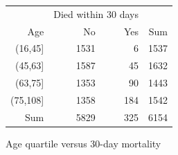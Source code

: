 \begin{figure}[ht]
\centering
\begin{tabular}{rrrr}
  \hline
    & \multicolumn{2}{c}{Died within 30 days} & \\
Age & No & Yes & Sum \\
  \hline
(16,45] & 1531 & 6 & 1537 \\
  (45,63] & 1587 & 45 & 1632 \\
  (63,75] & 1353 & 90 & 1443 \\
  (75,108] & 1358 & 184 & 1542 \\
  Sum & 5829 & 325 & 6154 \\
   \hline
\end{tabular}
\caption{Age quartile versus 30-day mortality}
\label{figure:mort30AgeTable}
\end{figure}

